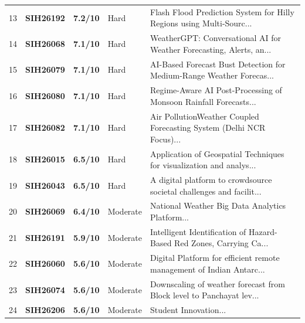 \documentclass[10pt,a4paper]{article}
\begin{document}
\begin{tabular}{rlllp{8.5cm}}
13 & \textbf{SIH26192} & \textbf{7.2/10} & Hard & Flash Flood Prediction System for Hilly Regions using Multi-Sourc... \\

14 & \textbf{SIH26068} & \textbf{7.1/10} & Hard & WeatherGPT: Conversational AI for Weather Forecasting, Alerts, an... \\

15 & \textbf{SIH26079} & \textbf{7.1/10} & Hard & AI-Based Forecast Bust Detection for Medium-Range Weather Forecas... \\

16 & \textbf{SIH26080} & \textbf{7.1/10} & Hard & Regime-Aware AI Post-Processing of Monsoon Rainfall Forecasts... \\

17 & \textbf{SIH26082} & \textbf{7.1/10} & Hard & Air PollutionWeather Coupled Forecasting System (Delhi NCR Focus)... \\

18 & \textbf{SIH26015} & \textbf{6.5/10} & Hard & Application of Geospatial Techniques for visualization and analys... \\

19 & \textbf{SIH26043} & \textbf{6.5/10} & Hard & A digital platform to crowdsource societal challenges and facilit... \\

20 & \textbf{SIH26069} & \textbf{6.4/10} & Moderate & National Weather Big Data Analytics Platform... \\

21 & \textbf{SIH26191} & \textbf{5.9/10} & Moderate & Intelligent Identification of Hazard-Based Red Zones, Carrying Ca... \\

22 & \textbf{SIH26060} & \textbf{5.6/10} & Moderate & Digital Platform for efficient remote management of Indian Antarc... \\

23 & \textbf{SIH26074} & \textbf{5.6/10} & Moderate & Downscaling of weather forecast from Block level to Panchayat lev... \\

24 & \textbf{SIH26206} & \textbf{5.6/10} & Moderate & Student Innovation... \\

\bottomrule
\end{tabular}

\vspace{0.8cm}
\newpage

\tableofcontents
\newpage
\end{document}
